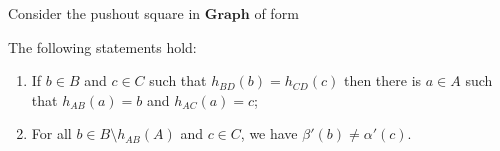 \begin{lemma}
    \label{lem:b_c_same_img_exist_a}
    Consider the pushout square in $\mathbf{Graph}$ of form
    \begin{center} 
    \end{center} 
    The following statements hold:
    \begin{enumerate}
        \item  If $ b\in B $ and $ c \mathop{\in} C $ such that $ h_{BD}(b) \mathop{=} h_{CD}(c) $ then there is $ a \mathop{\in} A $ such that $ h_{AB}(a) \mathop{=} b $ and $ h_{AC}(a)= c $;
        \item  For all \( b \mathop{\in} B \mathop{\setminus} h_{AB}(A) \) and \( c \mathop{\in} C \), we have \( \beta'(b) \mathop{\neq} \alpha'(c) \).
    \end{enumerate}
\end{lemma}
